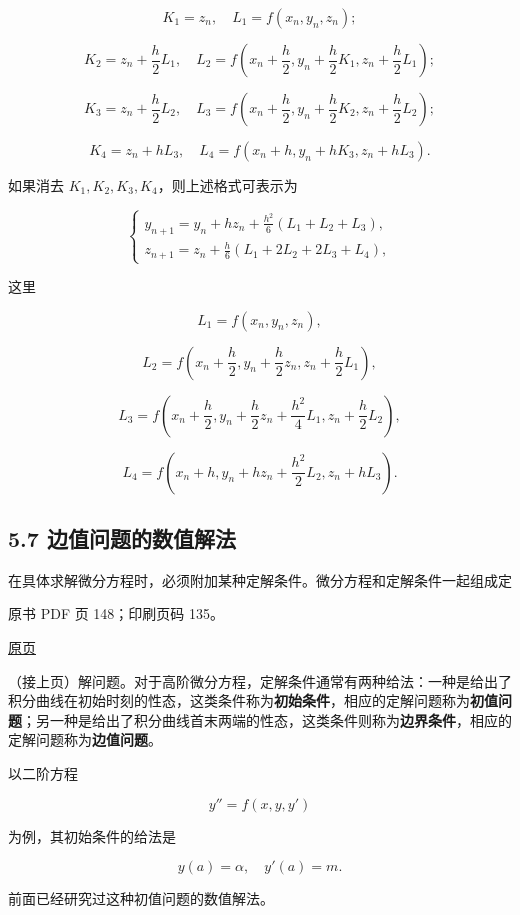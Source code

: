 \[
K_1=z_n,\quad L_1=f(x_n,y_n,z_n);
\]

\[
K_2=z_n+\frac h2L_1,\quad
L_2=f\left(x_n+\frac h2,y_n+\frac h2K_1,z_n+\frac h2L_1\right);
\]

\[
K_3=z_n+\frac h2L_2,\quad
L_3=f\left(x_n+\frac h2,y_n+\frac h2K_2,z_n+\frac h2L_2\right);
\]

\[
K_4=z_n+hL_3,\quad L_4=f(x_n+h,y_n+hK_3,z_n+hL_3).
\]

如果消去 \(K_1,K_2,K_3,K_4\)，则上述格式可表示为

\[
\begin{cases}
\displaystyle y_{n+1}=y_n+hz_n+\frac{h^2}{6}(L_1+L_2+L_3),\\[6pt]
\displaystyle z_{n+1}=z_n+\frac h6(L_1+2L_2+2L_3+L_4),
\end{cases}
\]

这里

\[
L_1=f(x_n,y_n,z_n),
\]

\[
L_2=f\left(x_n+\frac h2,y_n+\frac h2z_n,z_n+\frac h2L_1\right),
\]

\[
L_3=f\left(x_n+\frac h2,y_n+\frac h2z_n+\frac{h^2}{4}L_1,z_n+\frac h2L_2\right),
\]

\[
L_4=f\left(x_n+h,y_n+hz_n+\frac{h^2}{2}L_2,z_n+hL_3\right).
\]

\subsection{5.7 边值问题的数值解法}\label{ch05b-ux8fb9ux503cux95eeux9898ux7684ux6570ux503cux89e3ux6cd5}

在具体求解微分方程时，必须附加某种定解条件。微分方程和定解条件一起组成定

\clearpage

原书 PDF 页 148；印刷页码 135。

\href{source-images/pdf-148.jpeg}{原页}

（接上页）解问题。对于高阶微分方程，定解条件通常有两种给法：一种是给出了积分曲线在初始时刻的性态，这类条件称为\textbf{初始条件}，相应的定解问题称为\textbf{初值问题}；另一种是给出了积分曲线首末两端的性态，这类条件则称为\textbf{边界条件}，相应的定解问题称为\textbf{边值问题}。

以二阶方程

\[
y''=f(x,y,y')
\tag{5.7.1}
\]

为例，其初始条件的给法是

\[
y(a)=\alpha,\quad y'(a)=m.
\tag{5.7.2}
\]

前面已经研究过这种初值问题的数值解法。

